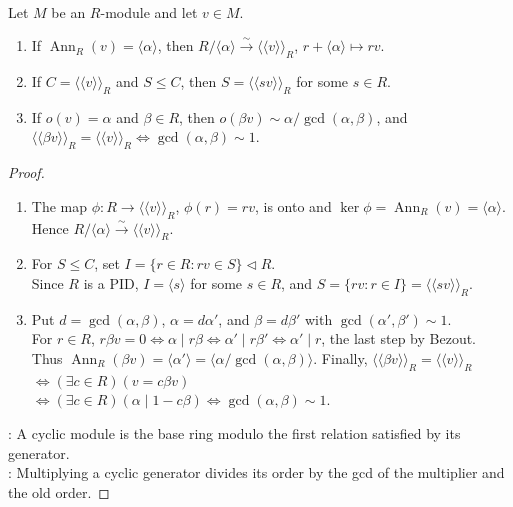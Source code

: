 \begin{theorem} \label{thm:cyclic-modules-over-pid} \\
Let $M$ be an $R$-module and let $v\in M$.
\begin{enumerate}[label=(\roman*)]
\setlength{\itemsep}{0pt}
\item If $\operatorname{Ann}_R(v)=\langle\alpha\rangle$, then $R/\langle\alpha\rangle\xrightarrow{\sim}\langle\!\langle v\rangle\!\rangle_R$, $r+\langle\alpha\rangle\mapsto rv$.
\item If $C=\langle\!\langle v\rangle\!\rangle_R$ and $S\leq C$, then $S=\langle\!\langle sv\rangle\!\rangle_R$ for some $s\in R$.
\item If $o(v)=\alpha$ and $\beta\in R$, then $o(\beta v)\sim\alpha/\gcd(\alpha,\beta)$, and $\langle\!\langle\beta v\rangle\!\rangle_R=\langle\!\langle v\rangle\!\rangle_R \Longleftrightarrow \gcd(\alpha,\beta)\sim1$.
\end{enumerate}
\begin{proof}
\begin{enumerate}[label=(\roman*)]
\setlength{\itemsep}{0pt}
\item The map $\phi:R\to\langle\!\langle v\rangle\!\rangle_R$, $\phi(r)=rv$, is onto and $\ker\phi=\operatorname{Ann}_R(v)=\langle\alpha\rangle$. Hence $R/\langle\alpha\rangle\xrightarrow{\sim}\langle\!\langle v\rangle\!\rangle_R$.
\item For $S\leq C$, set $I=\{r\in R:rv\in S\}\lhd R$.\\
Since $R$ is a PID, $I=\langle s\rangle$ for some $s\in R$, and $S=\{rv:r\in I\}=\langle\!\langle sv\rangle\!\rangle_R$.
\item Put $d=\gcd(\alpha,\beta)$, $\alpha=d\alpha'$, and $\beta=d\beta'$ with $\gcd(\alpha',\beta')\sim1$.\\
For $r\in R$, $r\beta v=0\Longleftrightarrow\alpha\mid r\beta \Longleftrightarrow\alpha'\mid r\beta'\Longleftrightarrow\alpha'\mid r$, the last step by Bezout.\\
Thus $\operatorname{Ann}_R(\beta v)=\langle\alpha'\rangle =\langle\alpha/\gcd(\alpha,\beta)\rangle$. Finally,
$\langle\!\langle\beta v\rangle\!\rangle_R=\langle\!\langle v\rangle\!\rangle_R$ $\Longleftrightarrow(\exists c\in R)(v=c\beta v)$\\
$\Longleftrightarrow(\exists c\in R)(\alpha\mid1-c\beta) \Longleftrightarrow\gcd(\alpha,\beta)\sim1$.
\end{enumerate}
\noindent
{}: A cyclic module is the base ring modulo the first relation satisfied by its generator.\\
: Multiplying a cyclic generator divides its order by the gcd of the multiplier and the old order.
\end{proof}
\end{theorem}

